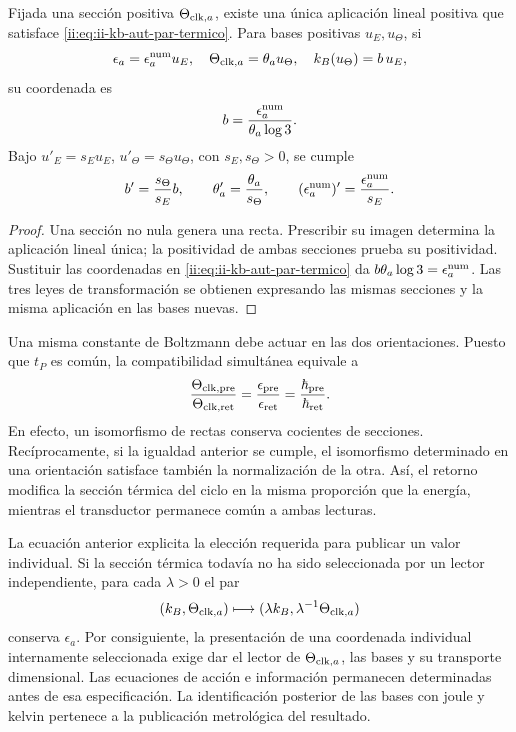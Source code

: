 \begin{theorem}
Fijada una sección positiva \(\Theta_{{\rm clk},a}\), existe una
única aplicación lineal positiva que satisface
\eqref{ii:eq:ii-kb-aut-par-termico}. Para bases positivas \(u_E,u_\Theta\),
si
\[
 \epsilon_a=\epsilon_a^{\rm num}u_E,\quad
 \Theta_{{\rm clk},a}=\theta_a u_\Theta,\quad
 k_B(u_\Theta)=b\,u_E,
\]
su coordenada es
\begin{equation}
 b=\frac{\epsilon_a^{\rm num}}{\theta_a\log3}.
 \label{ii:eq:ii-kb-aut-coordenada}
\end{equation}
Bajo \(u'_E=s_Eu_E\), \(u'_\Theta=s_\Theta u_\Theta\), con
\(s_E,s_\Theta>0\), se cumple
\[
 b'=\frac{s_\Theta}{s_E}b,\qquad
 \theta'_a=\frac{\theta_a}{s_\Theta},\qquad
 (\epsilon_a^{\rm num})'=\frac{\epsilon_a^{\rm num}}{s_E}.
\]
\end{theorem}
\begin{proof}
Una sección no nula genera una recta. Prescribir su imagen determina
la aplicación lineal única; la positividad de ambas secciones prueba
su positividad. Sustituir las coordenadas en
\eqref{ii:eq:ii-kb-aut-par-termico} da
\(b\theta_a\log3=\epsilon_a^{\rm num}\). Las tres leyes de
transformación se obtienen expresando las mismas secciones y la misma
aplicación en las bases nuevas.
\end{proof}

Una misma constante de Boltzmann debe actuar en las dos orientaciones.
Puesto que \(t_P\) es común, la compatibilidad simultánea equivale a
\begin{equation}
 \frac{\Theta_{{\rm clk},{\rm pre}}}{\Theta_{{\rm clk},{\rm ret}}}
 =\frac{\epsilon_{\rm pre}}{\epsilon_{\rm ret}}
 =\frac{\hbar_{\rm pre}}{\hbar_{\rm ret}}.
 \label{ii:eq:ii-kb-aut-orientaciones}
\end{equation}
En efecto, un isomorfismo de rectas conserva cocientes de secciones.
Recíprocamente, si la igualdad anterior se cumple, el isomorfismo
determinado en una orientación satisface también la normalización de
la otra. Así, el retorno modifica la sección térmica del ciclo en la
misma proporción que la energía, mientras el transductor permanece
común a ambas lecturas.

La ecuación anterior explicita la elección requerida para publicar un
valor individual. Si la sección térmica todavía no ha sido seleccionada
por un lector independiente, para cada \(\lambda>0\) el par
\[
 (k_B,\Theta_{{\rm clk},a})
 \longmapsto(\lambda k_B,\lambda^{-1}\Theta_{{\rm clk},a})
\]
conserva \(\epsilon_a\). Por consiguiente, la presentación de una
coordenada individual internamente seleccionada exige dar el lector de
\(\Theta_{{\rm clk},a}\), las bases y su transporte dimensional.
Las ecuaciones de acción e información permanecen determinadas antes
de esa especificación. La identificación posterior de las bases con
joule y kelvin pertenece a la publicación metrológica del resultado.

